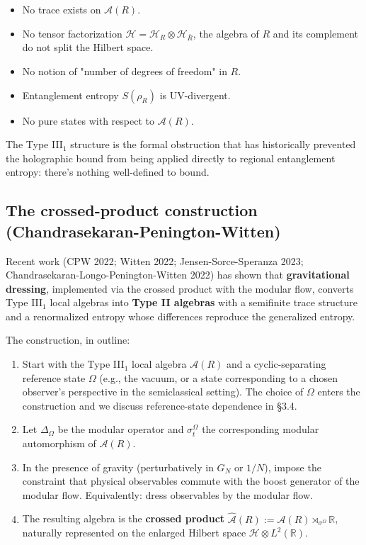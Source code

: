 \documentclass[11pt,a4paper]{article}
\begin{document}
\begin{itemize}
  \item No trace exists on $\mathcal{A}(R)$.
  \item No tensor factorization $\mathcal{H} = \mathcal{H}_R \otimes \mathcal{H}_{\bar R}$, the algebra of $R$ and its complement do not split the Hilbert space.
  \item No notion of "number of degrees of freedom" in $R$.
  \item Entanglement entropy $S(\rho_R)$ is UV-divergent.
  \item No pure states with respect to $\mathcal{A}(R)$.
\end{itemize}

The Type III$_1$ structure is the formal obstruction that has historically prevented the holographic bound from being applied directly to regional entanglement entropy: there's nothing well-defined to bound.

\subsection{The crossed-product construction (Chandrasekaran-Penington-Witten)}

Recent work (CPW 2022; Witten 2022; Jensen-Sorce-Speranza 2023; Chandrasekaran-Longo-Penington-Witten 2022) has shown that \textbf{gravitational dressing}, implemented via the crossed product with the modular flow, converts Type III$_1$ local algebras into \textbf{Type II algebras} with a semifinite trace structure and a renormalized entropy whose differences reproduce the generalized entropy.

The construction, in outline:

\begin{enumerate}
  \item Start with the Type III$_1$ local algebra $\mathcal{A}(R)$ and a cyclic-separating reference state $\Omega$ (e.g., the vacuum, or a state corresponding to a chosen observer's perspective in the semiclassical setting). The choice of $\Omega$ enters the construction and we discuss reference-state dependence in §3.4.
  \item Let $\Delta_\Omega$ be the modular operator and $\sigma_t^\Omega$ the corresponding modular automorphism of $\mathcal{A}(R)$.
  \item In the presence of gravity (perturbatively in $G_N$ or $1/N$), impose the constraint that physical observables commute with the boost generator of the modular flow. Equivalently: dress observables by the modular flow.
  \item The resulting algebra is the \textbf{crossed product} $\hat{\mathcal{A}}(R) := \mathcal{A}(R) \rtimes_{\sigma^\Omega} \mathbb{R}$, naturally represented on the enlarged Hilbert space $\mathcal{H} \otimes L^2(\mathbb{R})$.
\end{enumerate}
\end{document}
